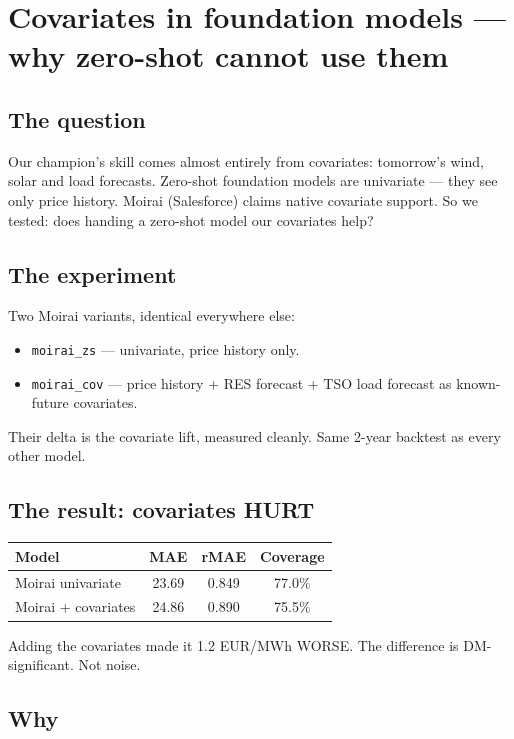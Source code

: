 \section{Covariates in foundation models --- why zero-shot cannot use them}

\subsection{The question}

Our champion's skill comes almost entirely from covariates:
tomorrow's wind, solar and load forecasts. Zero-shot foundation
models are univariate --- they see only price history.
Moirai (Salesforce) claims native covariate support.
So we tested: does handing a zero-shot model our covariates help?

\subsection{The experiment}

Two Moirai variants, identical everywhere else:
\begin{itemize}
\item \texttt{moirai\_zs} --- univariate, price history only.
\item \texttt{moirai\_cov} --- price history + RES forecast + TSO
      load forecast as known-future covariates.
\end{itemize}
Their delta is the covariate lift, measured cleanly.
Same 2-year backtest as every other model.

\subsection{The result: covariates HURT}

\begin{tabular}{lccc}
\hline
Model & MAE & rMAE & Coverage \\
\hline
Moirai univariate & 23.69 & 0.849 & 77.0\% \\
Moirai + covariates & 24.86 & 0.890 & 75.5\% \\
\hline
\end{tabular}

\vspace{0.5em}
Adding the covariates made it 1.2 EUR/MWh WORSE.
The difference is DM-significant. Not noise.

\subsection{Why}

